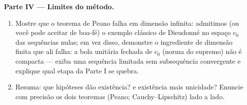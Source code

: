 \begin{problem}[{Problema de fim de semana --- existência de soluções
de $x' = f(t, x)$ sem Lipschitz}]
\medskip
\noindent\textbf{Parte IV --- Limites do método.}
\begin{enumerate}[resume]
  \item Mostre que o teorema de Peano falha em dimensão infinita:
        admitimos (ou você pode aceitar de boa-fé) o exemplo clássico
        de Dieudonné no espaço $c_0$ das sequências nulas; em vez
        disso, demonstre o ingrediente de dimensão finita que ali
        falha: a bola unitária fechada de $c_0$ (norma do supremo)
        não é compacta --- exiba uma sequência limitada sem
        subsequência convergente e explique qual etapa da Parte I se
        quebra.
  \item Resuma: que hipóteses dão existência? e existência mais
        unicidade? Enuncie com precisão os dois teoremas (Peano;
        Cauchy--Lipschitz) lado a lado.
\end{enumerate}


\end{problem}
